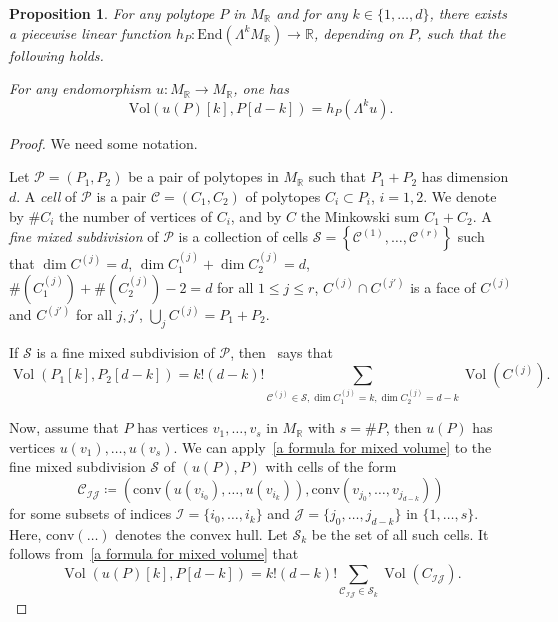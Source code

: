\documentclass[11pt,a4paper]{article}
\theoremstyle{plain}
\newtheorem{proposition}[theorem]{Proposition}
\theoremstyle{remark}
\theoremstyle{custombold}
\DeclareMathOperator{\vol}{Vol}
\begin{document}
\begin{proposition}\label{a formula for the k-degree}
    For any polytope $P$ in $M_{\mathbb R}$ and for any $k \in \{1, \ldots , d\}$, there exists a piecewise linear function $h_P \colon \mathrm{End}(\Lambda^k M_{\mathbb R}) \rightarrow \mathbb R$, depending on $P$, such that the following holds.

For any endomorphism $u\colon M_{\mathbb R} \rightarrow M_{\mathbb R}$, one has
$$\mathrm{Vol} (u(P)[k], P[d-k]) = h_P(\Lambda^k u).$$
\end{proposition}
\begin{proof}
    We need some notation.
    
    Let $\mathcal{P}=(P_1,P_2)$ be a pair of polytopes in $M_\mathbb R$ such that $P_1+P_2$ has dimension $d$. A \emph{cell} of $\mathcal{P}$ is a pair $\mathcal{C}=(C_1,C_2)$ of polytopes $C_i\subset P_i$, $i=1,2$. We denote by $\#C_i$ the number of vertices of $C_i$, and by $C$ the Minkowski sum $C_1+C_2$. A \emph{fine mixed subdivision} of $\mathcal{P}$ is a collection of cells $\mathcal{S}=\left\{\mathcal{C}^{(1)},\ldots,\mathcal{C}^{(r)}\right\}$ such that $\dim C^{(j)}=d$, $\dim C_1^{(j)}+\dim C_{2}^{(j)}=d$, $\#(C_1^{(j)})+\#(C_2^{(j)})-2=d$ for all $1\leq j\leq r$, $C^{(j)}\cap C^{(j')}$ is a face of $C^{(j)}$ and $C^{(j')}$ for all $j,j'$, $\bigcup_{j}C^{(j)}=P_1+P_2$. 
    
     If $\mathcal{S}$ is a fine mixed subdivision of $\mathcal{P}$, then~\cite[Theorem~2.4]{Huber-Sturmfels-1995} says that 
\begin{equation}\label{a formula for mixed volume}\vol(P_1[k],P_2[d-k])=k!(d-k)!\sum_{\mathcal{C}^{(j)}\in\mathcal{S},\dim C_1^{(j)}=k,\dim C_2^{(j)}=d-k}\vol(C^{(j)}).
\end{equation}

Now, assume that $P$ has vertices $v_1,\ldots,v_s$ in $M_{\mathbb R}$ with $s=\#P$, then $u(P)$ has vertices $u(v_1),\ldots,u(v_s)$. We can apply~\eqref{a formula for mixed volume} to the fine mixed subdivision $\mathcal{S}$ of $(u(P),P)$ with cells of the form $$\mathcal{C}_{\mathcal{I}\mathcal{J}}\coloneqq (\mathrm{conv}(u(v_{i_0}),\ldots,u(v_{i_k})),\mathrm{conv}(v_{j_0},\ldots,v_{j_{d-k}}))$$ for some subsets of indices $\mathcal{I}=\{i_0,\ldots,i_k\}$ and $\mathcal{J}=\{j_0,\ldots,j_{d-k}\}$ in $\{1,\ldots,s\}$. Here, $\mathrm{conv}(\ldots)$ denotes the convex hull. Let $\mathcal{S}_k$ be the set of all such cells. It follows from~\eqref{a formula for mixed volume} that
$$\vol(u(P)[k],P[d-k])=k!(d-k)!\sum_{\mathcal{C}_{\mathcal{I}\mathcal{J}}\in \mathcal{S}_k}\vol(C_{\mathcal{I}\mathcal{J}}).$$


\end{proof}
\end{document}
